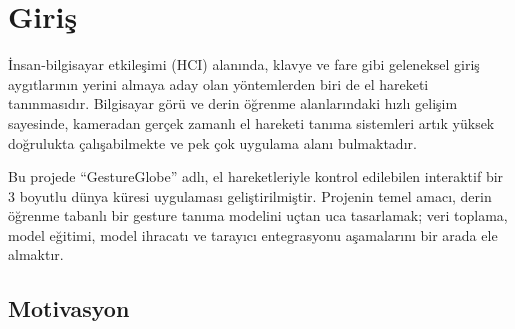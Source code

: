 \documentclass[12pt,a4paper]{article}
\begin{document}
\begin{abstract}
Bu çalışmada, gerçek zamanlı el hareketi tanınması kullanılarak web tarayıcısında 3 boyutlu bir dünya küresini kontrol eden uçtan uca bir derin öğrenme sistemi geliştirilmiştir. Sistem; veri toplama, model eğitimi ve web entegrasyonu olmak üzere üç ana aşamadan oluşmaktadır. MediaPipe Hands kütüphanesi ile elde edilen 21 el landmarkı, ön işleme adımından geçtikten sonra üç ayrı derin öğrenme mimarisine --- Çok Katmanlı Algılayıcı (MLP), 1 Boyutlu Evrişimsel Sinir Ağı (1D-CNN) ve Uzun Kısa Süreli Bellek (LSTM) --- beslenmiştir. 386 örnekli bir veri kümesi üzerinde gerçekleştirilen deneylerde, \textbf{1D-CNN modeli \%100 test doğruluğuyla} en iyi performansı sergilemiştir. Eğitilen model, ONNX Runtime Web aracılığıyla tarayıcıda çalıştırılmış ve Three.js tabanlı 3 boyutlu sahne ile entegre edilmiştir. Uygulama; açık avuç, kıstırma ve yumruk hareketlerini algılamasının yanı sıra küreyi döndürmek, yakınlaştırmak ve kilitlemek için bu hareketleri gerçek zamanlı olarak kullanabilmektedir.
\end{abstract}

\tableofcontents
\newpage

\section{Giriş}

İnsan-bilgisayar etkileşimi (HCI) alanında, klavye ve fare gibi geleneksel giriş aygıtlarının yerini almaya aday olan yöntemlerden biri de el hareketi tanınmasıdır. Bilgisayar görü ve derin öğrenme alanlarındaki hızlı gelişim sayesinde, kameradan gerçek zamanlı el hareketi tanıma sistemleri artık yüksek doğrulukta çalışabilmekte ve pek çok uygulama alanı bulmaktadır.

Bu projede ``GestureGlobe'' adlı, el hareketleriyle kontrol edilebilen interaktif bir 3 boyutlu dünya küresi uygulaması geliştirilmiştir. Projenin temel amacı, derin öğrenme tabanlı bir gesture tanıma modelini uçtan uca tasarlamak; veri toplama, model eğitimi, model ihracatı ve tarayıcı entegrasyonu aşamalarını bir arada ele almaktır.

\subsection{Motivasyon}
\end{document}
